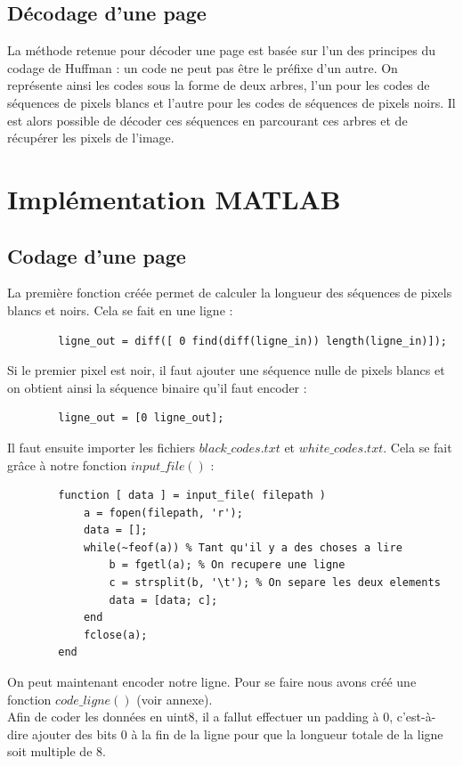 \documentclass[11pt]{article}
\begin{document}
	\subsection{Décodage d'une page}
	
	La méthode retenue pour décoder une page est basée sur l'un des principes du codage de Huffman : un code ne peut pas être le préfixe d'un autre. On représente ainsi les codes sous la forme de deux arbres, l'un pour les codes de séquences de pixels blancs et l'autre pour les codes de séquences de pixels noirs. Il est alors possible de décoder ces séquences en parcourant ces arbres et de récupérer les pixels de l'image.

\section{Implémentation MATLAB}
	
	\subsection{Codage d'une page}
	
	La première fonction créée permet de calculer la longueur des séquences de pixels blancs et noirs. Cela se fait en une ligne :
	\begin{lstlisting}
		ligne_out = diff([ 0 find(diff(ligne_in)) length(ligne_in)]);
	\end{lstlisting}

	Si le premier pixel est noir, il faut ajouter une séquence nulle de pixels blancs et on obtient ainsi la séquence binaire qu'il faut encoder :
	\begin{lstlisting}
		ligne_out = [0 ligne_out];
	\end{lstlisting}
	
	Il faut ensuite importer les fichiers $black\_codes.txt$ et $white\_codes.txt$. Cela se fait grâce à notre fonction $input\_file()$ :
	\begin{lstlisting}
		function [ data ] = input_file( filepath )
			a = fopen(filepath, 'r');
			data = [];
			while(~feof(a)) % Tant qu'il y a des choses a lire
				b = fgetl(a); % On recupere une ligne
				c = strsplit(b, '\t'); % On separe les deux elements
				data = [data; c];
			end
			fclose(a);
		end
	\end{lstlisting}
	
	On peut maintenant encoder notre ligne. Pour se faire nous avons créé une fonction $code\_ligne()$ (voir annexe).\\
	Afin de coder les données en uint8, il a fallut effectuer un padding à $0$, c'est-à-dire ajouter des bits $0$ à la fin de la ligne pour que la longueur totale de la ligne soit multiple de 8.
	
\end{document}
